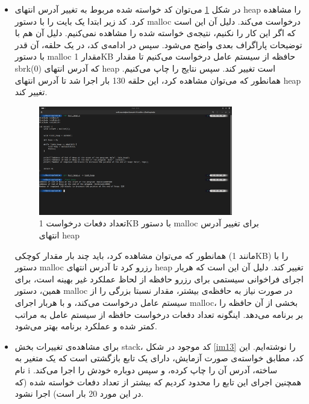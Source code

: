 \documentclass[12pt]{article}
\begin{document}
\begin{itemize}
        \item 
        در شکل
        \ref{im12}
        می‌توان کد خواسته شده مربوط به تغییر آدرس انتهای 
        \textenglish{heap}
        را مشاهده کرد.
        کد زیر ابتدا یک بایت را با دستور 
        \textenglish{malloc}
        درخواست می‌کند. دلیل آن این است که اگر این کار را نکنیم، نتیجه‌ی خواسته شده را مشاهده نمی‌کنیم. دلیل آن هم با توضیحات پاراگراف بعدی واضح می‌شود. سپس در ادامه‌ی کد، در یک حلقه، آن قدر با دستور
        \textenglish{malloc}
        مقدار 
        \textenglish{1KB} 
        حافظه از سیستم عامل درخواست می‌کنیم تا مقدار
        \textenglish{sbrk(0)}
        که آدرس انتهای 
        \textenglish{heap}
        است تغییر کند. سپس نتایج را چاپ می‌کنیم. همانطور که می‌توان مشاهده کرد، این حلقه 
        \textenglish{130}
        بار اجرا شد تا آدرس انتهای
        \textenglish{heap}
        تغییر کند.

        \begin{figure}[H]
		\centering
		\includegraphics[width=0.8\textwidth]{report6-resources/12.png}
		\caption{تعداد دفعات درخواست \textenglish{1KB} با دستور \textenglish{malloc} برای تغییر آدرس انتهای \textenglish{heap}}
            \label{im12}
	\end{figure}

        همانطور که می‌توان مشاهده کرد، باید چند بار مقدار کوچکی
        (مانند \textenglish{1KB})
        را با دستور
        \textenglish{malloc}
        رزرو کرد تا آدرس انتهای 
        \textenglish{heap}
        تغییر کند. دلیل آن این است که هربار اجرای فراخوانی سیستمی برای رزرو حافظه از لحاظ عملکرد غیر بهینه است، برای همین، دستور 
        \textenglish{malloc}
        در صورت نیاز به حافظه‌ی بیشتر، مقدار نسبتا بزرگی را از سیستم عامل درخواست می‌کند، و با هربار اجرای
        \textenglish{malloc}،
        بخشی از آن حافظه را بر برنامه می‌دهد. اینگونه تعداد دفعات درخواست حافظه از سیستم عامل
        به مراتب کمتر شده و عملکرد برنامه بهتر می‌شود.


        \item 
        برای مشاهده‌ی تغییرات بخش
        \textenglish{stack}، کد موجود در شکل 
        \ref{im13}
        را نوشته‌ایم. این کد، مطابق خواسته‌ی صورت آزمایش، دارای یک تابع بازگشتی است که یک متغیر به نام 
        \textenglish{i}
        ساخته، آدرس آن را چاپ کرده، و سپس دوباره خودش را اجرا می‌کند. همچنین اجرای این تابع را محدود کردیم که بیشتر از تعداد دفعات خواسته شده (که در این مورد 20 بار است) اجرا نشود.


\end{itemize}
\end{document}
